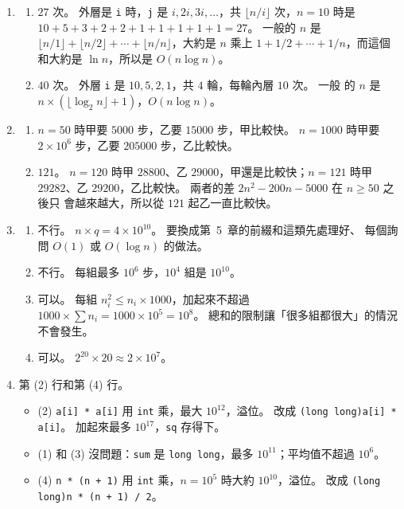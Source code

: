 \begin{enumerate}
\item
\begin{enumerate}
\item $27$ 次。 外層是 \texttt{i} 時，\texttt{j} 是 $i, 2i, 3i, \ldots$，共
$\lfloor n / i \rfloor$ 次，$n = 10$ 時是 $10 + 5 + 3 + 2 + 2 + 1 + 1 + 1 + 1 + 1
= 27$。 一般的 $n$ 是 $\lfloor n/1 \rfloor + \lfloor n/2 \rfloor + \cdots +
\lfloor n/n \rfloor$，大約是 $n$ 乘上 $1 + 1/2 + \cdots + 1/n$，而這個和大約是
$\ln n$，所以是 $O(n \log n)$。
\item $40$ 次。 外層 \texttt{i} 是 $10, 5, 2, 1$，共 $4$ 輪，每輪內層 $10$ 次。 一般
的 $n$ 是 $n \times (\lfloor \log_2 n \rfloor + 1)$，$O(n \log n)$。
\end{enumerate}

\item
\begin{enumerate}
\item $n = 50$ 時甲要 $5000$ 步，乙要 $15000$ 步，甲比較快。 $n = 1000$ 時甲要
$2 \times 10^6$ 步，乙要 $205000$ 步，乙比較快。
\item $121$。 $n = 120$ 時甲 $28800$、乙 $29000$，甲還是比較快；$n = 121$ 時甲
$29282$、乙 $29200$，乙比較快。 兩者的差 $2n^2 - 200n - 5000$ 在 $n \ge 50$ 之後只
會越來越大，所以從 $121$ 起乙一直比較快。
\end{enumerate}

\item
\begin{enumerate}
\item 不行。 $n \times q = 4 \times 10^{10}$。 要換成第~5~章的前綴和這類先處理好、
每個詢問 $O(1)$ 或 $O(\log n)$ 的做法。
\item 不行。 每組最多 $10^6$ 步，$10^4$ 組是 $10^{10}$。
\item 可以。 每組 $n_i^2 \le n_i \times 1000$，加起來不超過
$1000 \times \sum n_i = 1000 \times 10^5 = 10^8$。 總和的限制讓「很多組都很大」的情況
不會發生。
\item 可以。 $2^{20} \times 20 \approx 2 \times 10^7$。
\end{enumerate}

\item 第 (2) 行和第 (4) 行。
\begin{itemize}
\item (2) \texttt{a[i] * a[i]} 用 \texttt{int} 乘，最大 $10^{12}$，溢位。 改成
\texttt{(long long)a[i] * a[i]}。 加起來最多 $10^{17}$，\texttt{sq} 存得下。
\item (1) 和 (3) 沒問題：\texttt{sum} 是 \texttt{long long}，最多 $10^{11}$；平均值不超過 $10^6$。
\item (4) \texttt{n * (n + 1)} 用 \texttt{int} 乘，$n = 10^5$ 時大約 $10^{10}$，溢位。
改成 \texttt{(long long)n * (n + 1) / 2}。
\end{itemize}


\end{enumerate}
